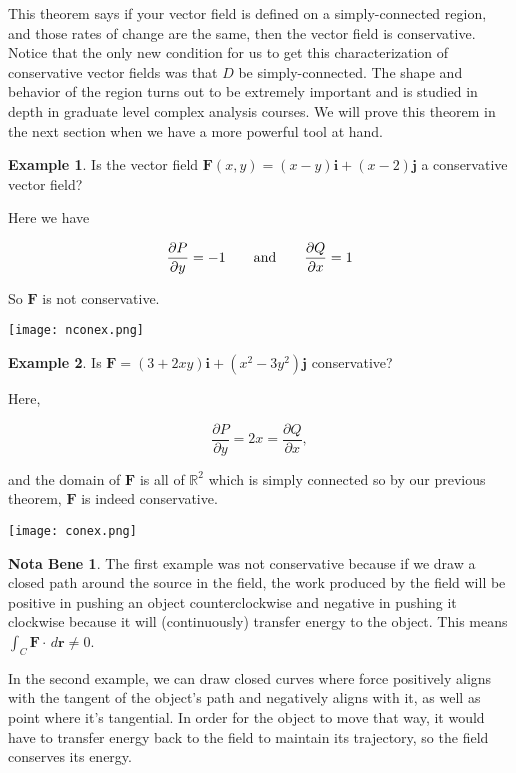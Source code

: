 \documentclass[11pt,oneside,english]{amsart}
\theoremstyle{definition}
\newtheorem*{example}{Example}
\newtheorem*{note}{Nota Bene}
\newcommand{\aspace}{\hspace{7mm}\text{and}\hspace{7mm}}
\newcommand{\R}{\mathbb{R}}
\newcommand{\pp}[2]{\frac{\partial{#1}}{\partial{#2}}}
\begin{document}
This theorem says if your vector field is defined on a simply-connected region, and those rates of change are the same, then the vector field is conservative. Notice that the only new condition for us to get this characterization of conservative vector fields was that $D$ be simply-connected. The shape and behavior of the region turns out to be extremely important and is studied in depth in graduate level complex analysis courses. We will prove this theorem in the next section when we have a more powerful tool at hand.

\begin{example}
Is the vector field $\mathbf{F}(x,y)=(x-y)\mathbf{i}+(x-2)\mathbf{j}$ a conservative vector field?

\begin{multicols}{2}
Here we have

\[
\pp{P}{y}=-1\aspace \pp{Q}{x}=1
\]

So $\mathbf{F}$ is not conservative.

\begin{center}
\texttt{[image: nconex.png]}
\end{center}

\end{multicols}

\end{example}


\begin{example}
Is $\mathbf{F}=(3+2xy)\mathbf{i}+(x^2-3y^2)\mathbf{j}$ conservative?

\begin{multicols}{2}
Here,

\[
\pp{P}{y}=2x=\pp{Q}{x},
\]

and the domain of $\mathbf{F}$ is all of $\R^2$ which is simply connected so by our previous theorem, $\mathbf{F}$ is indeed conservative.

\begin{center}
\texttt{[image: conex.png]}
\end{center}

\end{multicols}
\end{example}



\begin{note}
The first example was not conservative because if we draw a closed path around the source in the field, the work produced by the field will be positive in pushing an object counterclockwise and negative in pushing it clockwise because it will (continuously) transfer energy to the object. This means $\int_C\mathbf{F}\cdot\,d\mathbf{r}\neq0$.

In the second example, we can draw closed curves where force positively aligns with the tangent of the object's path and negatively aligns with it, as well as point where it's tangential. In order for the object to move that way, it would have to transfer energy back to the field to maintain its trajectory, so the field conserves its energy.
\end{note}
\end{document}
